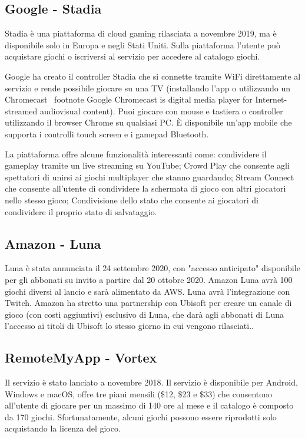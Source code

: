 \subsection{Google - Stadia}
Stadia è una piattaforma di cloud gaming rilasciata a novembre 2019, ma è disponibile solo in Europa e negli Stati Uniti. Sulla piattaforma l'utente può acquistare giochi o iscriversi al servizio per accedere al catalogo giochi.

Google ha creato il controller Stadia che si connette tramite WiFi direttamente al servizio e rende possibile giocare su una TV (installando l'app o utilizzando un Chromecast \ footnote {Google Chromecast is digital media player for Internet-streamed audiovisual content}). Puoi giocare con mouse e tastiera o controller utilizzando il browser Chrome su qualsiasi PC. È disponibile un'app mobile che supporta i controlli touch screen e i gamepad Bluetooth.

La piattaforma offre alcune funzionalità interessanti come: condividere il gameplay tramite un live streaming su YouTube; Crowd Play che consente agli spettatori di unirsi ai giochi multiplayer che stanno guardando; Stream Connect che consente all'utente di condividere la schermata di gioco con altri giocatori nello stesso gioco; Condivisione dello stato che consente ai giocatori di condividere il proprio stato di salvataggio\cite{Google_Stadia}.

\subsection{Amazon - Luna}
Luna è stata annunciata il 24 settembre 2020, con "accesso anticipato" disponibile per gli abbonati su invito a partire dal 20 ottobre 2020. Amazon Luna avrà 100 giochi diversi al lancio e sarà alimentato da AWS. Luna avrà l'integrazione con Twitch. Amazon ha stretto una partnership con Ubisoft per creare un canale di gioco (con costi aggiuntivi) esclusivo di Luna, che darà agli abbonati di Luna l'accesso ai titoli di Ubisoft lo stesso giorno in cui vengono rilasciati.\cite{Amazon_Luna}.

\subsection{RemoteMyApp - Vortex}
Il servizio è stato lanciato a novembre 2018. Il servizio è disponibile per Android, Windows e macOS, offre tre piani mensili (\$12, \$23 e \$33) che consentono all'utente di giocare per un massimo di 140 ore al mese e il catalogo è composto da 170 giochi. Sfortunatamente, alcuni giochi possono essere riprodotti solo acquistando la licenza del gioco\cite{RemoteMyApp_Vortex}.

